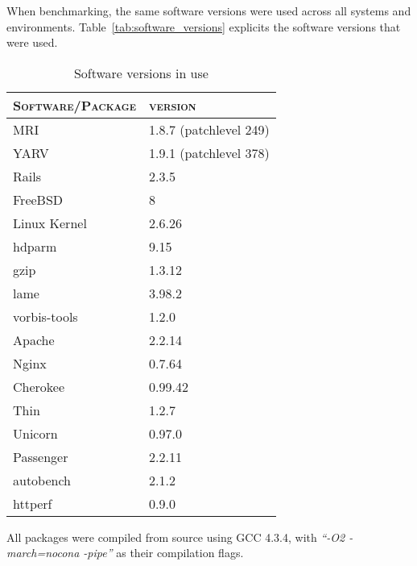 When benchmarking, the same software versions were used across all systems and environments. Table~\ref{tab:software_versions} explicits the software versions that were used.
\begin{table}[ht]
  \centering
  
  \begin{tabular}{p{}|p{}}
    \textsc{Software/Package}
  & \textsc{version} \\
  \hline
    MRI
  & 1.8.7 (patchlevel 249) \\
  
    YARV
  & 1.9.1 (patchlevel 378) \\
  
    Rails
  & 2.3.5 \\
  
    FreeBSD
  & 8 \\
  
    Linux Kernel
  & 2.6.26 \\
  
    hdparm
  & 9.15 \\
  
    gzip
  & 1.3.12 \\
  
    lame
  & 3.98.2 \\
  
    vorbis-tools
  & 1.2.0 \\
  
    Apache
  & 2.2.14 \\
  
    Nginx
  & 0.7.64 \\
  
    Cherokee
  & 0.99.42 \\
  
    Thin
  & 1.2.7 \\
  
    Unicorn
  & 0.97.0 \\
  
    Passenger
  & 2.2.11 \\
  
    autobench
  & 2.1.2 \\
  
    httperf
  & 0.9.0 \\
  \end{tabular}
  \caption{Software versions in use}
  \label{tab:machines_hardware_specification}
\end{table}
All packages were compiled from source using GCC 4.3.4, with \textit{``-O2 -march=nocona -pipe''} as their compilation flags.

